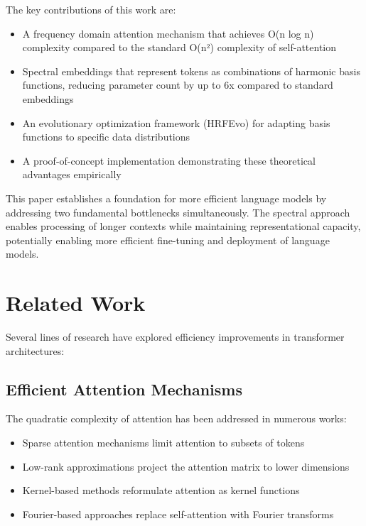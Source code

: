 \documentclass[10pt,twocolumn,letterpaper]{article}
\begin{document}
The key contributions of this work are:

\begin{itemize}
    \item A frequency domain attention mechanism that achieves O(n log n) complexity compared to the standard O(n²) complexity of self-attention
    \item Spectral embeddings that represent tokens as combinations of harmonic basis functions, reducing parameter count by up to 6x compared to standard embeddings
    \item An evolutionary optimization framework (HRFEvo) for adapting basis functions to specific data distributions
    \item A proof-of-concept implementation demonstrating these theoretical advantages empirically
\end{itemize}

This paper establishes a foundation for more efficient language models by addressing two fundamental bottlenecks simultaneously. The spectral approach enables processing of longer contexts while maintaining representational capacity, potentially enabling more efficient fine-tuning and deployment of language models.

\section{Related Work}

Several lines of research have explored efficiency improvements in transformer architectures:

\subsection{Efficient Attention Mechanisms}

The quadratic complexity of attention has been addressed in numerous works:

\begin{itemize}
    \item Sparse attention mechanisms \cite{child2019generating, beltagy2020longformer} limit attention to subsets of tokens
    \item Low-rank approximations \cite{wang2020linformer} project the attention matrix to lower dimensions
    \item Kernel-based methods \cite{katharopoulos2020transformers, choromanski2021rethinking} reformulate attention as kernel functions
    \item Fourier-based approaches \cite{lee2021fnet} replace self-attention with Fourier transforms
\end{itemize}
\end{document}
